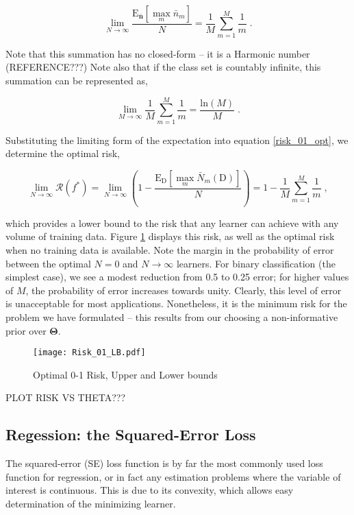 \documentclass[12pt]{article}
\begin{document}
\begin{equation}
\lim_{N \to \infty} \frac{\text{E}_{\bar{\bm{n}}} \left[ \max_m \bar{n}_m \right]}{N} = \frac{1}{M} \sum_{m=1}^M \frac{1}{m} \;.
\end{equation}

Note that this summation has no closed-form -- it is a Harmonic number (REFERENCE???) Note also that if the class set is countably infinite, this summation can be represented as,

\begin{equation}
\lim_{M \to \infty} \frac{1}{M} \sum_{m=1}^M \frac{1}{m} = \frac{\text{ln}(M)}{M} \;.
\end{equation}

Substituting the limiting form of the expectation into equation \eqref{risk_01_opt}, we determine the optimal risk,

\begin{equation}
\lim_{N \to \infty} \mathcal{R}(f^*)  = \lim_{N \to \infty} \left( 1 - \frac{\text{E}_\mathrm{D} \left[ \max_m \bar{N}_m(\mathrm{D}) \right]}{N} \right) = 1 - \frac{1}{M} \sum_{m=1}^M \frac{1}{m} \;,
\end{equation}

which provides a lower bound to the risk that any learner can achieve with any volume of training data. Figure \ref{fig:Risk_01_LB} displays this risk, as well as the optimal risk when no training data is available. Note the margin in the probability of error between the optimal $N=0$ and $N \to \infty$ learners. For binary classification (the simplest case), we see a modest reduction from 0.5 to 0.25 error; for higher values of $M$, the probability of error increases towards unity. Clearly, this level of error is unacceptable for most applications. Nonetheless, it is the minimum risk for the problem we have formulated -- this results from our choosing a non-informative prior over $\bm{\Theta}$.


\begin{figure}
\centering
\texttt{[image: Risk\_01\_LB.pdf]}
\caption{Optimal 0-1 Risk, Upper and Lower bounds}
\label{fig:Risk_01_LB}
\end{figure}

PLOT RISK VS THETA???


\subsection{Regession: the Squared-Error Loss}

The squared-error (SE) loss function is by far the most commonly used loss function for regression, or in fact any estimation problems where the variable of interest is continuous. This is due to its convexity, which allows easy determination of the minimizing learner. 
\end{document}
